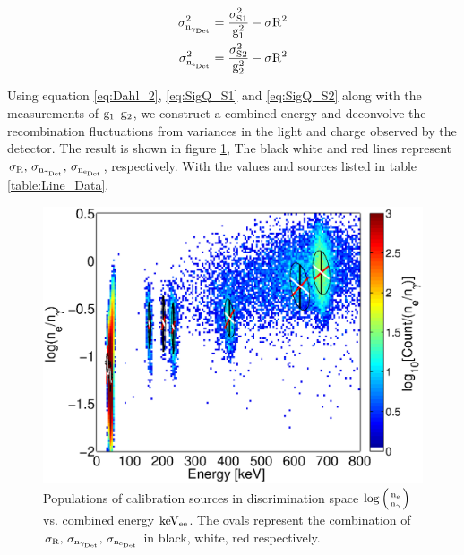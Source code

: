 \begin{alignat}{2}
\label{eq:SigQ_S1} \rm  \sigma_{n_{\gamma_{Det}}}^2 = \frac{\sigma_{S1}^2}{g_1^2} - \sigma{R^2}\\
\label{eq:SigQ_S2} \rm \sigma_{n_{e_{Det}}}^2 = \frac{\sigma_{S2}^2}{g_2^2} - \sigma{R^2}
\end{alignat}


Using equation \ref{eq:Dahl_2}, \ref{eq:SigQ_S1} and \ref{eq:SigQ_S2} along with the measurements of $\rm g_1$ $\rm g_2$, we construct a combined energy and deconvolve the recombination fluctuations from variances in the light and charge observed by the detector. The result is shown in figure \ref{fig:E_dis}, The black white and red lines represent $\rm \sigma_R, \, \sigma_{n_{\gamma_{Det}}}, \,\sigma_{n_{e_{Det}}}$, respectively. With the values and sources listed in table \ref{table:Line_Data}.

\renewcommand{\baselinestretch}{1}
\small\normalsize
 \begin{figure}[h!]\centering
\includegraphics[width=130mm]{Chapter_Flucs/Figures/All_disc.eps}
\caption{Populations of calibration sources in discrimination space $\rm log\left(\frac{n_e}{n_\gamma}\right) $ vs. combined energy $\rm keV_{ee}$. The ovals represent the combination of $\rm \sigma_R, \, \sigma_{n_{\gamma_{Det}}}, \,\sigma_{n_{e_{Det}}} $ in black, white, red respectively.}
\label{fig:E_dis}
\end{figure}
\renewcommand{\baselinestretch}{2}
\small\normalsize

